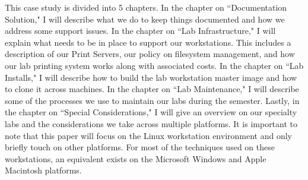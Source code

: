 This case study is divided into 5 chapters.  In the chapter on ``Documentation Solution," I will describe what we do to keep things documented and how we address some support issues.  In the chapter on ``Lab Infrastructure," I will explain what needs to be in place to support our workstations.  This includes a description of our Print Servers, our policy on filesystem management, and how our lab printing system works along with associated costs.  In the chapter on ``Lab Installs," I will describe how to build the lab workstation master image and how to clone it across machines.  In the chapter on ``Lab Maintenance," I will describe some of the processes we use to maintain our labs during the semester.  Lastly, in the chapter on ``Special Considerations," I will give an overview on our specialty labs and the considerations we take across multiple platforms.  It is important to note that this paper will focus on the Linux workstation environment and only briefly touch on other platforms.  For most of the techniques used on these workstations, an equivalent exists on the Microsoft Windows and Apple Macintosh platforms.
